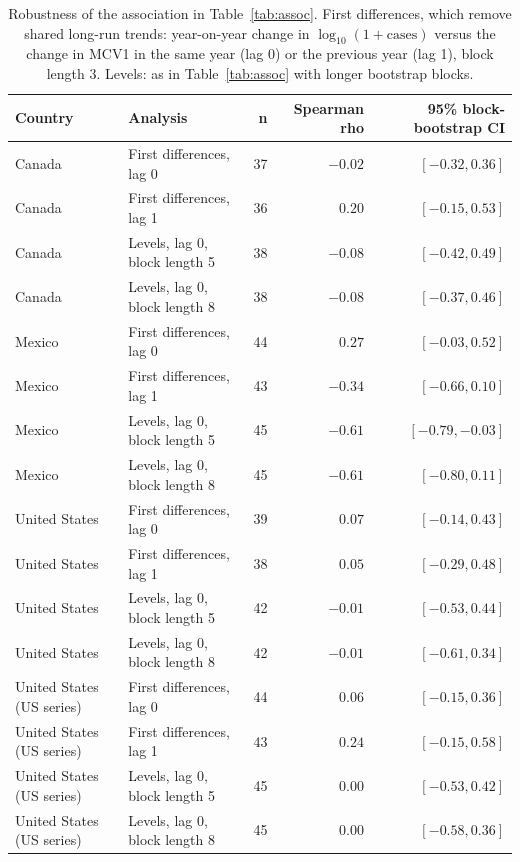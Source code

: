 \begin{table}[htbp]
\centering
\small
\caption{Robustness of the association in Table~\ref{tab:assoc}. First differences, which remove shared long-run trends: year-on-year change in $\log_{10}(1+\text{cases})$ versus the change in MCV1 in the same year (lag 0) or the previous year (lag 1), block length 3. Levels: as in Table~\ref{tab:assoc} with longer bootstrap blocks.}
\label{tab:robust}
\begin{tabular}{llrrr}
\toprule
Country & Analysis & n & Spearman rho & 95\% block-bootstrap CI \\
\midrule
Canada & First differences, lag 0 & 37 & $-0.02$ & $[-0.32, 0.36]$ \\
Canada & First differences, lag 1 & 36 & $0.20$ & $[-0.15, 0.53]$ \\
Canada & Levels, lag 0, block length 5 & 38 & $-0.08$ & $[-0.42, 0.49]$ \\
Canada & Levels, lag 0, block length 8 & 38 & $-0.08$ & $[-0.37, 0.46]$ \\
Mexico & First differences, lag 0 & 44 & $0.27$ & $[-0.03, 0.52]$ \\
Mexico & First differences, lag 1 & 43 & $-0.34$ & $[-0.66, 0.10]$ \\
Mexico & Levels, lag 0, block length 5 & 45 & $-0.61$ & $[-0.79, -0.03]$ \\
Mexico & Levels, lag 0, block length 8 & 45 & $-0.61$ & $[-0.80, 0.11]$ \\
United States & First differences, lag 0 & 39 & $0.07$ & $[-0.14, 0.43]$ \\
United States & First differences, lag 1 & 38 & $0.05$ & $[-0.29, 0.48]$ \\
United States & Levels, lag 0, block length 5 & 42 & $-0.01$ & $[-0.53, 0.44]$ \\
United States & Levels, lag 0, block length 8 & 42 & $-0.01$ & $[-0.61, 0.34]$ \\
United States (US series) & First differences, lag 0 & 44 & $0.06$ & $[-0.15, 0.36]$ \\
United States (US series) & First differences, lag 1 & 43 & $0.24$ & $[-0.15, 0.58]$ \\
United States (US series) & Levels, lag 0, block length 5 & 45 & $0.00$ & $[-0.53, 0.42]$ \\
United States (US series) & Levels, lag 0, block length 8 & 45 & $0.00$ & $[-0.58, 0.36]$ \\
\bottomrule
\end{tabular}
\end{table}
